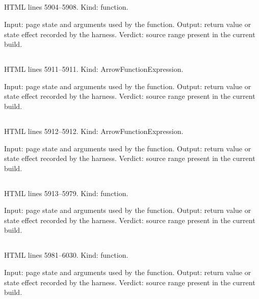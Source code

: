 \subsection*{\texttt{}}
\label{vf_272_ccParseJavaDate}
HTML lines 5904--5908. Kind: function.

Input: page state and arguments used by the function.
Output: return value or state effect recorded by the harness.
Verdict: source range present in the current build.

\subsection*{\texttt{}}
\label{vf_273_ccQ}
HTML lines 5911--5911. Kind: ArrowFunctionExpression.

Input: page state and arguments used by the function.
Output: return value or state effect recorded by the harness.
Verdict: source range present in the current build.

\subsection*{\texttt{}}
\label{vf_274_ccMedian}
HTML lines 5912--5912. Kind: ArrowFunctionExpression.

Input: page state and arguments used by the function.
Output: return value or state effect recorded by the harness.
Verdict: source range present in the current build.

\subsection*{\texttt{}}
\label{vf_275_ccStatic}
HTML lines 5913--5979. Kind: function.

Input: page state and arguments used by the function.
Output: return value or state effect recorded by the harness.
Verdict: source range present in the current build.

\subsection*{\texttt{}}
\label{vf_276_ccDynamic}
HTML lines 5981--6030. Kind: function.

Input: page state and arguments used by the function.
Output: return value or state effect recorded by the harness.
Verdict: source range present in the current build.


